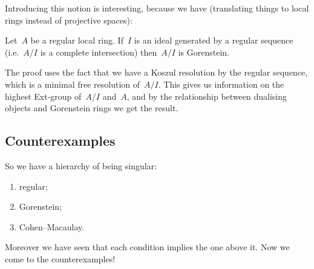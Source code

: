 \documentclass[10pt,a4paper]{article}
\begin{document}
Introducing this notion is interesting, because we have \cite[corollary 21.19]{eisenbud-commutative-algebra} (translating things to local rings instead of projective spaces):
\begin{theorem}
  \label{theorem:complete-intersections-are-Gorenstein}
  Let~$A$ be a regular local ring. If~$I$ is an ideal generated by a regular sequence (i.e.\ $A/I$ is a complete intersection) then~$A/I$ is Gorenstein.
\end{theorem}
The proof uses the fact that we have a Koszul resolution by the regular sequence, which is a minimal free resolution of~$A/I$. This gives us information on the highest Ext-group of~$A/I$ and~$A$, and by the relationship between dualising objects and Gorenstein rings \cite[theorem 21.15]{eisenbud-commutative-algebra} we get the result.

\subsection{Counterexamples}
\label{subsection:counterexamples}
So we have a hierarchy of being singular:
\begin{enumerate}
  \item regular;
  \item Gorenstein;
  \item Cohen--Macaulay.
\end{enumerate}
Moreover we have seen that each condition implies the one above it. Now we come to the counterexamples!
\end{document}
